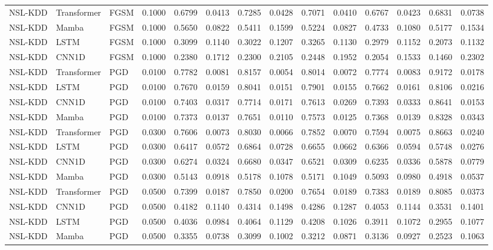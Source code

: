\begin{table}[ht]
\begin{tabular}{lllrrrrrrrrrrr}
NSL-KDD & Transformer & FGSM & 0.1000 & 0.6799 & 0.0413 & 0.7285 & 0.0428 & 0.7071 & 0.0410 & 0.6767 & 0.0423 & 0.6831 & 0.0738 \\
NSL-KDD & Mamba & FGSM & 0.1000 & 0.5650 & 0.0822 & 0.5411 & 0.1599 & 0.5224 & 0.0827 & 0.4733 & 0.1080 & 0.5177 & 0.1534 \\
NSL-KDD & LSTM & FGSM & 0.1000 & 0.3099 & 0.1140 & 0.3022 & 0.1207 & 0.3265 & 0.1130 & 0.2979 & 0.1152 & 0.2073 & 0.1132 \\
NSL-KDD & CNN1D & FGSM & 0.1000 & 0.2380 & 0.1712 & 0.2300 & 0.2105 & 0.2448 & 0.1952 & 0.2054 & 0.1533 & 0.1460 & 0.2302 \\
NSL-KDD & Transformer & PGD & 0.0100 & 0.7782 & 0.0081 & 0.8157 & 0.0054 & 0.8014 & 0.0072 & 0.7774 & 0.0083 & 0.9172 & 0.0178 \\
NSL-KDD & LSTM & PGD & 0.0100 & 0.7670 & 0.0159 & 0.8041 & 0.0151 & 0.7901 & 0.0155 & 0.7662 & 0.0161 & 0.8106 & 0.0216 \\
NSL-KDD & CNN1D & PGD & 0.0100 & 0.7403 & 0.0317 & 0.7714 & 0.0171 & 0.7613 & 0.0269 & 0.7393 & 0.0333 & 0.8641 & 0.0153 \\
NSL-KDD & Mamba & PGD & 0.0100 & 0.7373 & 0.0137 & 0.7651 & 0.0110 & 0.7573 & 0.0125 & 0.7368 & 0.0139 & 0.8328 & 0.0343 \\
NSL-KDD & Transformer & PGD & 0.0300 & 0.7606 & 0.0073 & 0.8030 & 0.0066 & 0.7852 & 0.0070 & 0.7594 & 0.0075 & 0.8663 & 0.0240 \\
NSL-KDD & LSTM & PGD & 0.0300 & 0.6417 & 0.0572 & 0.6864 & 0.0728 & 0.6655 & 0.0662 & 0.6366 & 0.0594 & 0.5748 & 0.0276 \\
NSL-KDD & CNN1D & PGD & 0.0300 & 0.6274 & 0.0324 & 0.6680 & 0.0347 & 0.6521 & 0.0309 & 0.6235 & 0.0336 & 0.5878 & 0.0779 \\
NSL-KDD & Mamba & PGD & 0.0300 & 0.5143 & 0.0918 & 0.5178 & 0.1078 & 0.5171 & 0.1049 & 0.5093 & 0.0980 & 0.4918 & 0.0537 \\
NSL-KDD & Transformer & PGD & 0.0500 & 0.7399 & 0.0187 & 0.7850 & 0.0200 & 0.7654 & 0.0189 & 0.7383 & 0.0189 & 0.8085 & 0.0373 \\
NSL-KDD & CNN1D & PGD & 0.0500 & 0.4182 & 0.1140 & 0.4314 & 0.1498 & 0.4286 & 0.1287 & 0.4053 & 0.1144 & 0.3531 & 0.1401 \\
NSL-KDD & LSTM & PGD & 0.0500 & 0.4036 & 0.0984 & 0.4064 & 0.1129 & 0.4208 & 0.1026 & 0.3911 & 0.1072 & 0.2955 & 0.1077 \\
NSL-KDD & Mamba & PGD & 0.0500 & 0.3355 & 0.0738 & 0.3099 & 0.1002 & 0.3212 & 0.0871 & 0.3136 & 0.0927 & 0.2523 & 0.1063 \\

\end{tabular}
\end{table}
